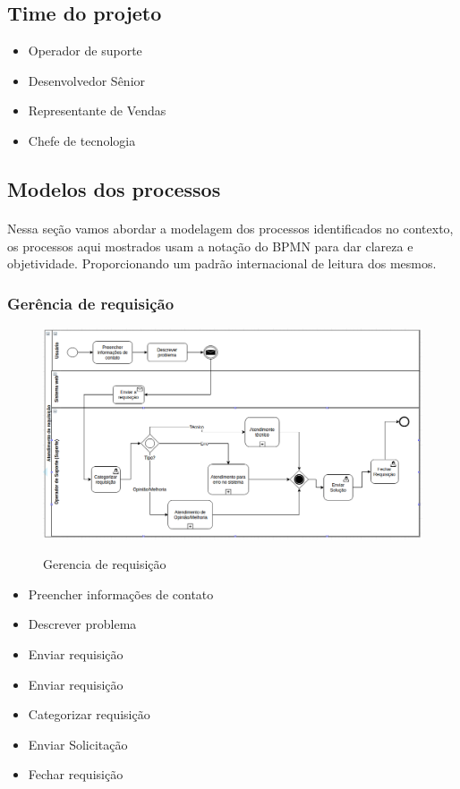 \documentclass[11pt,a4paper]{article}
\begin{document}
\subsection{Time do projeto}
\begin{itemize}[noitemsep]
  \item Operador de suporte
  \item Desenvolvedor Sênior
  \item Representante de Vendas
  \item Chefe de tecnologia
\end{itemize}




\subsection{Modelos dos processos}
\paragraph{}
Nessa seção vamos abordar a modelagem dos processos identificados no contexto,
os processos aqui mostrados usam a notação do BPMN para dar clareza e objetividade.
Proporcionando um padrão internacional de leitura dos mesmos.


\subsubsection{Gerência de requisição}
\begin{figure}[!h]
\caption{Gerencia de requisição}
\centering %
\includegraphics[width=15cm]{as-is/01_atendimento_de_requisicao.png}
\label{figura:atendimento_requisicao_as_is}
\end{figure}

\begin{itemize}[noitemsep]
	\item Preencher informações de contato
	\item Descrever problema
	\item Enviar requisição
	\item Enviar requisição
	\item Categorizar requisição
	\item Enviar Solicitação
	\item Fechar requisição
\end{itemize}
\end{document}
